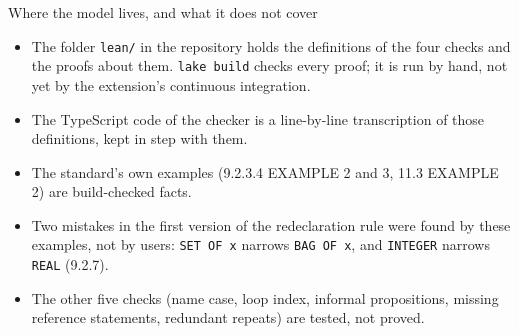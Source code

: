 \documentclass[11pt]{beamer}
\newcommand{\code}[1]{\texttt{#1}}
\begin{document}
\begin{frame}{Where the model lives, and what it does not cover}
  \begin{itemize}
    \item The folder \code{lean/} in the repository holds the definitions of the four checks
      and the proofs about them. \code{lake build} checks every proof; it is run by hand,
      not yet by the extension's continuous integration.
    \item The TypeScript code of the checker is a line-by-line transcription of those
      definitions, kept in step with them.
    \item The standard's own examples (9.2.3.4 EXAMPLE 2 and 3, 11.3 EXAMPLE 2) are
      build-checked facts.
    \item Two mistakes in the first version of the redeclaration rule were found by
      these examples, not by users: \code{SET OF x} narrows \code{BAG OF x}, and
      \code{INTEGER} narrows \code{REAL} (9.2.7).
    \item The other five checks (name case, loop index, informal propositions, missing
      reference statements, redundant repeats) are tested, not proved.
  \end{itemize}
\end{frame}
\end{document}
